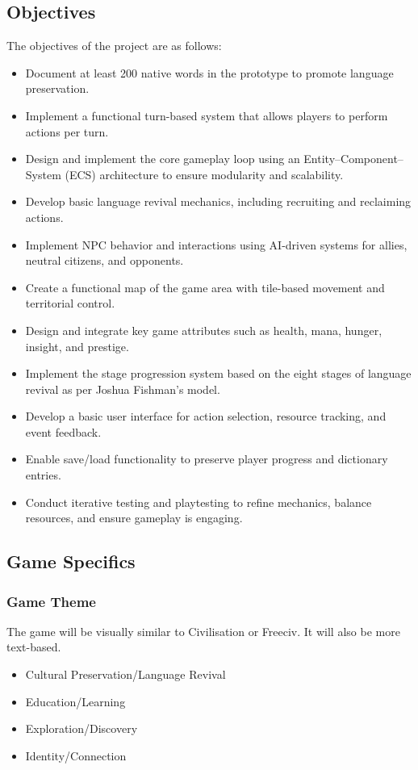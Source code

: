 \documentclass[11pt]{article}
\begin{document}
\subsection{Objectives}
The objectives of the project are as follows:

\begin{itemize}
    \item Document at least 200 native words in the prototype to promote language preservation.
    \item Implement a functional turn-based system that allows players to perform actions per turn.
    \item Design and implement the core gameplay loop using an Entity–Component–System (ECS) architecture to ensure modularity and scalability.
    \item Develop basic language revival mechanics, including recruiting and reclaiming actions.
    \item Implement NPC behavior and interactions using AI-driven systems for allies, neutral citizens, and opponents.
    \item Create a functional map of the game area with tile-based movement and territorial control.
    \item Design and integrate key game attributes such as health, mana, hunger, insight, and prestige.
    \item Implement the stage progression system based on the eight stages of language revival as per Joshua Fishman’s model.
    \item Develop a basic user interface for action selection, resource tracking, and event feedback.
    \item Enable save/load functionality to preserve player progress and dictionary entries.
    \item Conduct iterative testing and playtesting to refine mechanics, balance resources, and ensure gameplay is engaging.
\end{itemize}

\subsection{Game Specifics}
\subsubsection{Game Theme}
The game will be visually similar to Civilisation or Freeciv. It will also be more text-based.
\begin{itemize}
\item
  Cultural Preservation/Language Revival
\item
  Education/Learning
\item
  Exploration/Discovery
\item
  Identity/Connection
\end{itemize}
\end{document}

